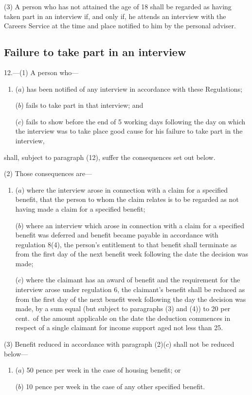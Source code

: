 \documentclass[12pt,a4paper]{article}
\begin{document}
(3) A person who has not attained the age of 18 shall be regarded as having taken part in an interview if, and only if, he attends an interview with the Careers Service at the time and place notified to him by the personal adviser.

\subsection[12. Failure to take part in an interview]{Failure to take part in an interview}

12.---(1)  A person who—
\begin{enumerate}\item[]
($a$) has been notified of any interview in accordance with these Regulations;

($b$) fails to take part in that interview; and

($c$) fails to show before the end of 5 working days following the day on which the interview was to take place good cause for his failure to take part in the interview,
\end{enumerate}
shall, subject to paragraph (12), suffer the consequences set out below.

(2) Those consequences are—
\begin{enumerate}\item[]
($a$) where the interview arose in connection with a claim for a specified benefit, that the person to whom the claim relates is to be regarded as not having made a claim for a specified benefit;

($b$) where an interview which arose in connection with a claim for a specified benefit was deferred and benefit became payable in accordance with regulation 8(4), the person’s entitlement to that benefit shall terminate as from the first day of the next benefit week following the date the decision was made;

($c$) where the claimant has an award of benefit and the requirement for the interview arose under regulation 6, the claimant’s benefit shall be reduced as from the first day of the next benefit week following the day the decision was made, by a sum equal (but subject to paragraphs (3) and (4)) to 20 per cent.\ of the amount applicable on the date the deduction commences in respect of a single claimant for income support aged not less than 25.
\end{enumerate}

(3) Benefit reduced in accordance with paragraph (2)($c$)  shall not be reduced below—
\begin{enumerate}\item[]
($a$) 50 pence per week in the case of housing benefit; or

($b$) 10 pence per week in the case of any other specified benefit.
\end{enumerate}
\end{document}
